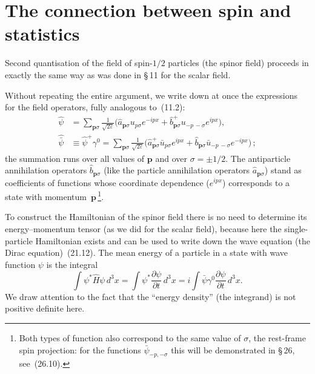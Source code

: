 \section{The connection between spin and statistics}

Second quantisation of the field of spin-$1/2$ particles (the spinor field) proceeds in exactly the same way as was done in \S\,11 for the scalar field.

Without repeating the entire argument, we write down at once the expressions for the field operators, fully analogous to~(11.2):
\begin{equation}
\begin{aligned}
\widehat\psi &= \sum_{\mathbf{p}\sigma}\frac{1}{\sqrt{2\varepsilon}}\bigl(\widehat a_{\mathbf{p}\sigma}u_{p\sigma}e^{-ipx} + \widehat b^+_{\mathbf{p}\sigma}u_{-p\,-\sigma}e^{ipx}\bigr),\\
\widehat{\bar\psi} &\equiv \widehat\psi^+\gamma^0 = \sum_{\mathbf{p}\sigma}\frac{1}{\sqrt{2\varepsilon}}\bigl(\widehat a^+_{\mathbf{p}\sigma}\bar u_{p\sigma}e^{ipx} + \widehat b_{\mathbf{p}\sigma}\bar u_{-p\,-\sigma}e^{-ipx}\bigr)\,;
\end{aligned}
\tag{25.1}
\end{equation}
the summation runs over all values of $\mathbf{p}$ and over $\sigma = \pm 1/2$. The antiparticle annihilation operators $\widehat b_{\mathbf{p}\sigma}$ (like the particle annihilation operators $\widehat a_{\mathbf{p}\sigma}$) stand as coefficients of functions whose coordinate dependence ($e^{ipx}$) corresponds to a state with momentum~$\mathbf{p}$\,\footnote{Both types of function also correspond to the same value of $\sigma$, the rest-frame spin projection: for the functions $\bar\psi_{-p,-\sigma}$ this will be demonstrated in \S\,26, see~(26.10).}.

To construct the Hamiltonian of the spinor field there is no need to determine its energy--momentum tensor (as we did for the scalar field), because here the single-particle Hamiltonian exists and can be used to write down the wave equation (the Dirac equation)~(21.12). The mean energy of a particle in a state with wave function $\psi$ is the integral
\begin{equation}
\int \psi^*\widehat H\psi\,d^3x = \int \psi^*\frac{\partial\psi}{\partial t}\,d^3x = i\int \bar\psi\gamma^0\frac{\partial\psi}{\partial t}\,d^3x.
\tag{25.2}
\end{equation}
We draw attention to the fact that the ``energy density'' (the integrand) is not positive definite here.

